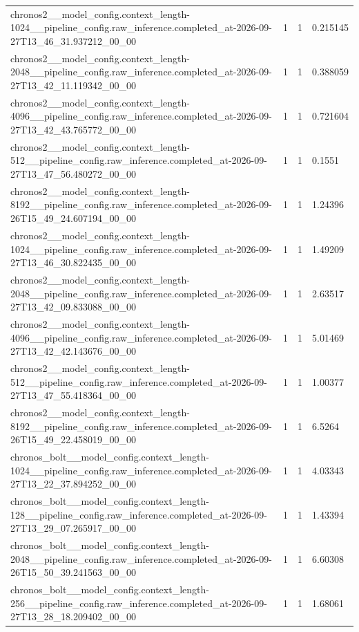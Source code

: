 \begin{tabular}{llll}
chronos2\_\_model\_config.context\_length-1024\_\_pipeline\_config.raw\_inference.completed\_at-2026-09-27T13\_46\_31.937212\_00\_00 & 1 & 1 & 0.215145 \\
chronos2\_\_model\_config.context\_length-2048\_\_pipeline\_config.raw\_inference.completed\_at-2026-09-27T13\_42\_11.119342\_00\_00 & 1 & 1 & 0.388059 \\
chronos2\_\_model\_config.context\_length-4096\_\_pipeline\_config.raw\_inference.completed\_at-2026-09-27T13\_42\_43.765772\_00\_00 & 1 & 1 & 0.721604 \\
chronos2\_\_model\_config.context\_length-512\_\_pipeline\_config.raw\_inference.completed\_at-2026-09-27T13\_47\_56.480272\_00\_00 & 1 & 1 & 0.1551 \\
chronos2\_\_model\_config.context\_length-8192\_\_pipeline\_config.raw\_inference.completed\_at-2026-09-26T15\_49\_24.607194\_00\_00 & 1 & 1 & 1.24396 \\
chronos2\_\_model\_config.context\_length-1024\_\_pipeline\_config.raw\_inference.completed\_at-2026-09-27T13\_46\_30.822435\_00\_00 & 1 & 1 & 1.49209 \\
chronos2\_\_model\_config.context\_length-2048\_\_pipeline\_config.raw\_inference.completed\_at-2026-09-27T13\_42\_09.833088\_00\_00 & 1 & 1 & 2.63517 \\
chronos2\_\_model\_config.context\_length-4096\_\_pipeline\_config.raw\_inference.completed\_at-2026-09-27T13\_42\_42.143676\_00\_00 & 1 & 1 & 5.01469 \\
chronos2\_\_model\_config.context\_length-512\_\_pipeline\_config.raw\_inference.completed\_at-2026-09-27T13\_47\_55.418364\_00\_00 & 1 & 1 & 1.00377 \\
chronos2\_\_model\_config.context\_length-8192\_\_pipeline\_config.raw\_inference.completed\_at-2026-09-26T15\_49\_22.458019\_00\_00 & 1 & 1 & 6.5264 \\
chronos\_bolt\_\_model\_config.context\_length-1024\_\_pipeline\_config.raw\_inference.completed\_at-2026-09-27T13\_22\_37.894252\_00\_00 & 1 & 1 & 4.03343 \\
chronos\_bolt\_\_model\_config.context\_length-128\_\_pipeline\_config.raw\_inference.completed\_at-2026-09-27T13\_29\_07.265917\_00\_00 & 1 & 1 & 1.43394 \\
chronos\_bolt\_\_model\_config.context\_length-2048\_\_pipeline\_config.raw\_inference.completed\_at-2026-09-26T15\_50\_39.241563\_00\_00 & 1 & 1 & 6.60308 \\
chronos\_bolt\_\_model\_config.context\_length-256\_\_pipeline\_config.raw\_inference.completed\_at-2026-09-27T13\_28\_18.209402\_00\_00 & 1 & 1 & 1.68061 \\

\end{tabular}
